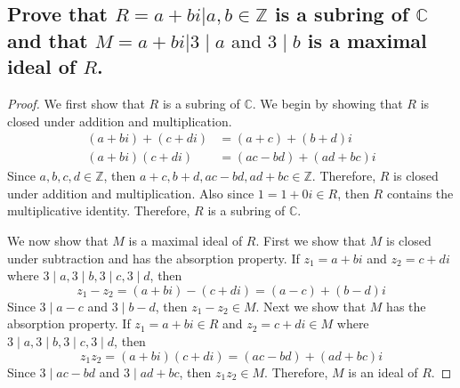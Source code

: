 \documentclass{article}
\theoremstyle{plain} %
\theoremstyle{definition} %
\begin{document}
\subsection*{Prove that $R = {a+bi | a,b \in \mathbb{Z}}$ is a subring
of $\mathbb{C}$ and that $M = {a+bi | 3\mid a \text{ and } 3\mid b}$ is a maximal
ideal of $R$.}
\begin{proof}
    We first show that $R$ is a subring of $\mathbb{C}$.
    We begin by showing that $R$ is closed under addition and multiplication.
    \begin{align*}
        (a+bi) + (c+di) &= (a+c) + (b+d)i \\
        (a+bi)(c+di) &= (ac-bd) + (ad+bc)i
    \end{align*}
    Since $a,b,c,d \in \mathbb{Z}$, then $a+c, b+d, ac-bd, ad+bc \in \mathbb{Z}$.
    Therefore, $R$ is closed under addition and multiplication.
    Also since $1 = 1 + 0i \in R$, then $R$ contains the multiplicative identity.
    Therefore, $R$ is a subring of $\mathbb{C}$.

    We now show that $M$ is a maximal ideal of $R$.
    First we show that $M$ is closed under subtraction and has the absorption property.
    If $z_1 = a+bi$ and $z_2 = c+di$ where $3 \mid a, 3 \mid b, 3 \mid c, 3 \mid d$, then
    \[
        z_1 - z_2 = (a+bi) - (c+di) = (a-c) + (b-d)i
    \] 
    Since $3 \mid a-c$ and $3 \mid b-d$, then $z_1 - z_2 \in M$.
    Next we show that $M$ has the absorption property.
    If $z_1 = a+bi \in R$ and $z_2 = c+di \in M$ where $3 \mid a, 3 \mid b, 3 \mid c, 3 \mid d$, then
    \[
        z_1z_2 = (a+bi)(c+di) = (ac-bd) + (ad+bc)i
    \] 
    Since $3 \mid ac-bd$ and $3 \mid ad+bc$, then $z_1z_2 \in M$.
    Therefore, $M$ is an ideal of $R$.


\end{proof}
\end{document}
